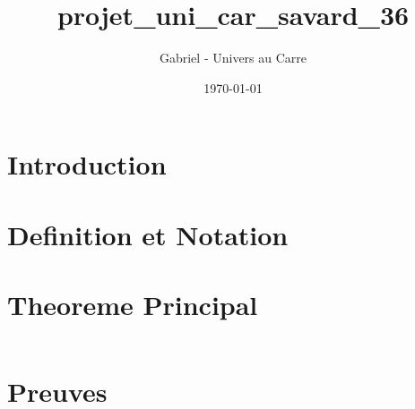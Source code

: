 \documentclass[12pt]{article}
\title{projet_uni_car_savard_36}
\author{Gabriel - Univers au Carre}
\date{\today}
\begin{document}
\maketitle


\section{Introduction}



\section{Definition et Notation}



\section{Theoreme Principal}


\begin{equation}
\end{equation}


\section{Preuves}


\end{document}
